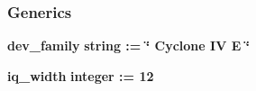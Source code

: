 \subsubsection*{Generics}
 \begin{DoxyCompactItemize}
\item 
{\bf dev\+\_\+family} {\bfseries {\bfseries \textcolor{comment}{string}\textcolor{vhdlchar}{ }\textcolor{vhdlchar}{ }\textcolor{vhdlchar}{\+:}\textcolor{vhdlchar}{=}\textcolor{vhdlchar}{ }\textcolor{vhdlchar}{ }\textcolor{vhdlchar}{ }\textcolor{vhdlchar}{ }\textcolor{keyword}{\char`\"{} Cyclone I\+V E \char`\"{}}\textcolor{vhdlchar}{ }}}
\item 
{\bf iq\+\_\+width} {\bfseries {\bfseries \textcolor{comment}{integer}\textcolor{vhdlchar}{ }\textcolor{vhdlchar}{ }\textcolor{vhdlchar}{\+:}\textcolor{vhdlchar}{=}\textcolor{vhdlchar}{ }\textcolor{vhdlchar}{ } \textcolor{vhdldigit}{12} \textcolor{vhdlchar}{ }}}
\end{DoxyCompactItemize}

